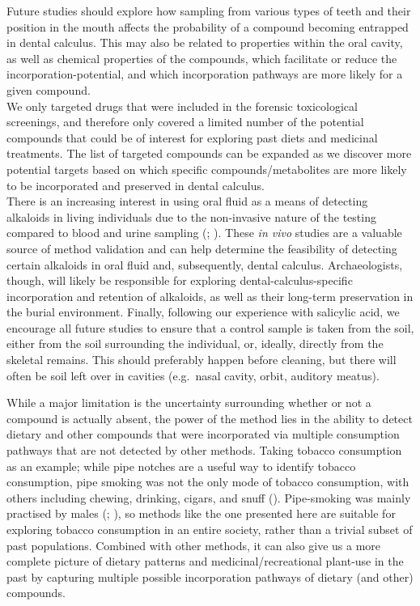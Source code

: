\documentclass[
  b5paper,
]{book}
\begin{document}
Future studies should explore how sampling from various types of teeth
and their position in the mouth affects the probability of a compound
becoming entrapped in dental calculus. This may also be related to
properties within the oral cavity, as well as chemical properties of the
compounds, which facilitate or reduce the incorporation-potential, and
which incorporation pathways are more likely for a given compound.\\
We only targeted drugs that were included in the forensic toxicological
screenings, and therefore only covered a limited number of the potential
compounds that could be of interest for exploring past diets and
medicinal treatments. The list of targeted compounds can be expanded as
we discover more potential targets based on which specific
compounds/metabolites are more likely to be incorporated and preserved
in dental calculus.\\
There is an increasing interest in using oral fluid as a means of
detecting alkaloids in living individuals due to the non-invasive nature
of the testing compared to blood and urine sampling
(;
). These
\emph{in vivo} studies are a valuable source of method validation and
can help determine the feasibility of detecting certain alkaloids in
oral fluid and, subsequently, dental calculus. Archaeologists, though,
will likely be responsible for exploring dental-calculus-specific
incorporation and retention of alkaloids, as well as their long-term
preservation in the burial environment. Finally, following our
experience with salicylic acid, we encourage all future studies to
ensure that a control sample is taken from the soil, either from the
soil surrounding the individual, or, ideally, directly from the skeletal
remains. This should preferably happen before cleaning, but there will
often be soil left over in cavities (e.g.~nasal cavity, orbit, auditory
meatus).

While a major limitation is the uncertainty surrounding whether or not a
compound is actually absent, the power of the method lies in the ability
to detect dietary and other compounds that were incorporated via
multiple consumption pathways that are not detected by other methods.
Taking tobacco consumption as an example; while pipe notches are a
useful way to identify tobacco consumption, pipe smoking was not the
only mode of tobacco consumption, with others including chewing,
drinking, cigars, and snuff
().
Pipe-smoking was mainly practised by males
(;
), so
methods like the one presented here are suitable for exploring tobacco
consumption in an entire society, rather than a trivial subset of past
populations. Combined with other methods, it can also give us a more
complete picture of dietary patterns and medicinal/recreational
plant-use in the past by capturing multiple possible incorporation
pathways of dietary (and other) compounds.
\end{document}
